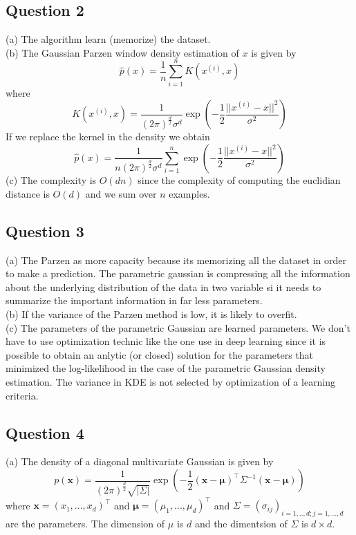 \documentclass[12pt]{article}
\begin{document}
\subsection*{Question 2}
(a) The algorithm learn (memorize) the dataset.\\

(b) The Gaussian Parzen window density estimation of $x$ is given by 
$$
    \hat{p}(x) = \frac{1}{n}\sum_{i=1}^n K(x^{(i)}, x)
$$
where 
$$
K(x^{(i)}, x) =
\frac{1}{(2\pi)^\frac{d}{2}\sigma^d}
\exp\left(-\frac{1}{2}\frac{||x^{(i)}-x||^2}{\sigma^2}\right)
$$
If we replace the kernel in the density we obtain
$$
\hat{p}(x) = \frac{1}{n(2\pi)^\frac{d}{2}\sigma^d}\sum_{i=1}^n
\exp\left(-\frac{1}{2}\frac{||x^{(i)}-x||^2}{\sigma^2}\right)
$$
(c) The complexity is $O(dn)$ since the complexity of computing the euclidian distance is $O(d)$ and we sum over $n$ examples. \\

\subsection*{Question 3}
(a) The Parzen  as more capacity because its memorizing all the dataset in order to make a prediction. The parametric gaussian is compressing all the information about the underlying distribution of the data in two variable si it needs to summarize the important information in far less parameters.\\

(b) If the variance of the Parzen method is low, it is likely to overfit.\\

(c) The parameters of the parametric Gaussian are learned parameters. We don't have to use optimization technic like the one use in deep learning since it is possible to obtain an anlytic (or closed) solution for the parameters that minimized the log-likelihood in the case of the parametric Gaussian density estimation. The variance in KDE is not selected by optimization of a learning criteria.

\subsection*{Question 4}
(a) The density of a diagonal multivariate Gaussian is given by
\begin{equation}
p(\bm{x}) 
= \frac{1}{(2\pi)^\frac{d}{2}\sqrt{|\Sigma|}}
\exp\left(
   - \frac{1}{2}(\bm{x}-\bm{\mu})^\top\Sigma^{-1}(\bm{x}-\bm{\mu})
\right)
\label{eq:diag_normal}
\end{equation}
where $\bm{x}=(x_1,...,x_d)^\top $ and $\bm{\mu}=(\mu_1,...,\mu_d)^\top$ and $\Sigma=\left(\sigma_{ij}\right)_{i=1,..,d; j=1,...,d}$ are the parameters. The dimension of $\mu$ is $d$ and the dimentsion of $\Sigma$ is $d\times d$.\\
\end{document}
